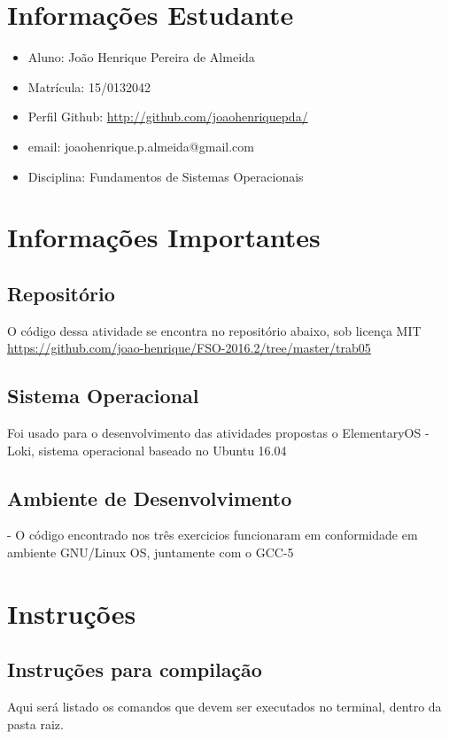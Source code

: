 \documentclass[11pt,a4paper]{article}
\begin{document}
\section{Informações Estudante}
\begin{itemize}
\item Aluno: João Henrique Pereira de Almeida
\item Matrícula: 15/0132042
\item Perfil Github: \href{http://github.com/joao-henrique/}{http://github.com/joaohenriquepda/}
\item email: joaohenrique.p.almeida@gmail.com
\item Disciplina: Fundamentos de Sistemas Operacionais
\end{itemize}


\section{Informações Importantes}
\subsection{Repositório}
O código dessa atividade se encontra no repositório abaixo, sob licença MIT
\url{https://github.com/joao-henrique/FSO-2016.2/tree/master/trab05}
\subsection{Sistema Operacional}

Foi usado para o desenvolvimento das atividades propostas o ElementaryOS - Loki, sistema operacional baseado no Ubuntu 16.04

\subsection{Ambiente de Desenvolvimento }
- O código encontrado nos três exercicios funcionaram em
conformidade em ambiente GNU/Linux OS, juntamente com o GCC-5

\section{Instruções}
\subsection{Instruções para compilação}
Aqui será listado os comandos que devem ser executados no terminal, dentro da pasta raiz.
\end{document}
